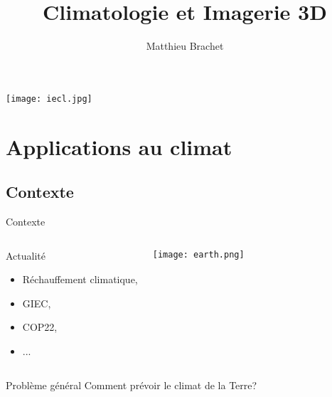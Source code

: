 \documentclass[11pt]{beamer}
\author{Matthieu Brachet}
\title{Climatologie et Imagerie 3D}
\begin{document}
\begin{frame}
\titlepage
\texttt{[image: iecl.jpg]}
\end{frame}

\begin{frame}
\tableofcontents
\end{frame}

\section{Applications au climat}
\subsection{Contexte}
\begin{frame}{Contexte}
\begin{columns}
\begin{block}{Actualité}
\begin{itemize}
\item Réchauffement climatique,
\item GIEC,
\item COP22,
\item ...
\end{itemize}
\end{block}

\begin{center}
\texttt{[image: earth.png]}
\end{center}
\end{columns}

\begin{block}{Problème général}
Comment prévoir le climat de la Terre?
\end{block}
\end{frame}
\end{document}
